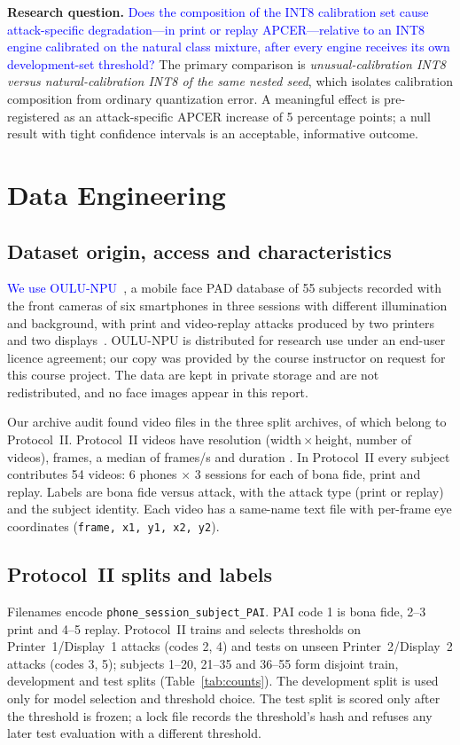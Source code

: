 \documentclass[conference]{IEEEtran}
\newcommand{\scope}[1]{\textcolor{blue}{#1}}
\begin{document}
\textbf{Research question.} \scope{Does the composition of the INT8 calibration set cause attack-specific
degradation---in print or replay APCER---relative to an INT8 engine calibrated on the natural class mixture,
after every engine receives its own development-set threshold?} The primary comparison is \emph{unusual-calibration
INT8 versus natural-calibration INT8 of the same nested seed}, which isolates calibration composition from
ordinary quantization error. A meaningful effect is pre-registered as an attack-specific APCER increase of
5 percentage points; a null result with tight confidence intervals is an acceptable, informative outcome.

\section{Data Engineering}
\subsection{Dataset origin, access and characteristics}
\scope{We use OULU-NPU~\cite{boulkenafet2017oulu}}, a mobile face PAD database of 55 subjects recorded with the
front cameras of six smartphones in three sessions with different illumination and background, with print and
video-replay attacks produced by two printers and two displays~\cite{boulkenafet2017oulu}. OULU-NPU is distributed
for research use under an end-user licence agreement; our copy was provided by the course instructor on request
for this course project. The data are kept in private storage and are not redistributed, and no face images appear
in this report.

Our archive audit found \QPADNumVideoMembers{} video files in the three split archives, of which
\QPADNumVideos{} belong to Protocol~II. Protocol~II videos have resolution \QPADResolutions{}
(width\,$\times$\,height, number of videos), \QPADFrameCount{} frames, a median of \QPADFps{} frames/s and
duration \QPADDuration{}.
In Protocol~II every subject contributes 54 videos: 6 phones $\times$ 3 sessions for each of bona fide, print
and replay. Labels are bona fide versus attack, with the attack type (print or replay) and the subject identity.
Each video has a same-name text file with per-frame eye coordinates (\texttt{frame, x1, y1, x2, y2}).

\subsection{Protocol~II splits and labels}
Filenames encode \texttt{phone\_session\_subject\_PAI}. PAI code 1 is bona fide, 2--3 print and 4--5 replay.
Protocol~II trains and selects thresholds on Printer~1/Display~1 attacks (codes 2, 4) and tests on unseen
Printer~2/Display~2 attacks (codes 3, 5); subjects 1--20, 21--35 and 36--55 form disjoint train, development
and test splits (Table~\ref{tab:counts}). The development split is used only for model selection and threshold
choice. The test split is scored only after the threshold is frozen; a lock file records the threshold's
hash and refuses any later test evaluation with a different threshold.
\end{document}
